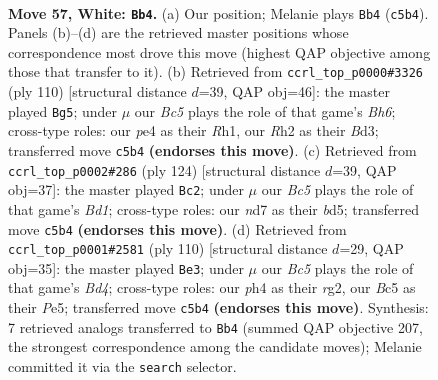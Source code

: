 \documentclass[11pt]{article}
\begin{document}
\clearpage

\begin{figure}[p]\centering
\begin{subfigure}{0.46\textwidth}\centering
\resizebox{\linewidth}{!}{%
\newchessgame
\chessboard[
  setfen={7k/3n1p2/8/2B2K2/p3p2p/P6P/3r1P1R/8 w - - 14 57},
  showmover=false,
  pgfstyle=straightmove, color=movearrow, markmove={c5-b4}
]}
\caption{}
\end{subfigure}\hfill
\begin{subfigure}{0.46\textwidth}\centering
\resizebox{\linewidth}{!}{%
\newchessgame
\chessboard[
  setfen={7r/2kn1r2/7B/ppp2P2/5K1P/P2B4/2P5/7R w - - 2 56},
  showmover=false,
  pgfstyle=straightmove, color=movearrow, markmove={h6-g5}
]}
\caption{}
\end{subfigure}
\\[4pt]
\begin{subfigure}{0.46\textwidth}\centering
\resizebox{\linewidth}{!}{%
\newchessgame
\chessboard[
  setfen={8/4k3/2p4p/r2b3P/P3pP2/4K3/8/R2B4 w - - 3 63},
  showmover=false,
  pgfstyle=straightmove, color=movearrow, markmove={d1-c2}
]}
\caption{}
\end{subfigure}\hfill
\begin{subfigure}{0.46\textwidth}\centering
\resizebox{\linewidth}{!}{%
\newchessgame
\chessboard[
  setfen={4k3/2p5/2n1pK2/2P1P3/3BP2P/7R/6r1/8 w - - 17 56},
  showmover=false,
  pgfstyle=straightmove, color=movearrow, markmove={d4-e3}
]}
\caption{}
\end{subfigure}
\caption{\textbf{Move 57, White: \texttt{Bb4}.} (a) Our position; Melanie plays \texttt{Bb4} (\texttt{c5b4}). Panels (b)--(d) are the retrieved master positions whose correspondence most drove this move (highest QAP objective among those that transfer to it). (b) Retrieved from \texttt{ccrl\_top\_p0000\#3326} (ply 110) [structural distance $d$=39, QAP obj=46]: the master played \texttt{Bg5}; under $\mu$ our \emph{Bc5} plays the role of that game's \emph{Bh6}; cross-type roles: our \emph{p}e4 as their \emph{R}h1, our \emph{R}h2 as their \emph{B}d3; transferred move \texttt{c5b4} \textbf{(endorses this move)}. (c) Retrieved from \texttt{ccrl\_top\_p0002\#286} (ply 124) [structural distance $d$=39, QAP obj=37]: the master played \texttt{Bc2}; under $\mu$ our \emph{Bc5} plays the role of that game's \emph{Bd1}; cross-type roles: our \emph{n}d7 as their \emph{b}d5; transferred move \texttt{c5b4} \textbf{(endorses this move)}. (d) Retrieved from \texttt{ccrl\_top\_p0001\#2581} (ply 110) [structural distance $d$=29, QAP obj=35]: the master played \texttt{Be3}; under $\mu$ our \emph{Bc5} plays the role of that game's \emph{Bd4}; cross-type roles: our \emph{p}h4 as their \emph{r}g2, our \emph{B}c5 as their \emph{P}e5; transferred move \texttt{c5b4} \textbf{(endorses this move)}. Synthesis: 7 retrieved analogs transferred to \texttt{Bb4} (summed QAP objective 207, the strongest correspondence among the candidate moves); Melanie committed it via the \texttt{search} selector.}
\label{fig:thought-m112}
\end{figure}
\end{document}
